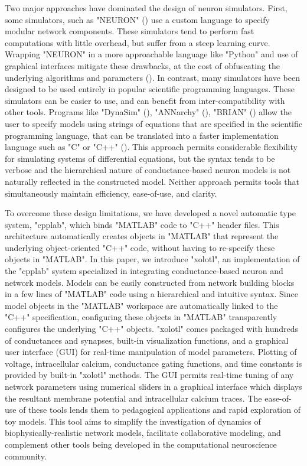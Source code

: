 \documentclass{frontiersSCNS} %
\begin{document}
Two major approaches have dominated the design of neuron simulators. First, some simulators, such as "NEURON" (\cite{hinesNEURONSimulationEnvironment1997}) use a custom language to specify modular network components. These simulators tend to perform fast computations with little overhead, but suffer from a steep learning curve. Wrapping "NEURON" in a more approachable language like "Python" and use of graphical interfaces mitigate these drawbacks, at the cost of obfuscating the underlying algorithms and parameters (\cite{bretteSimulationNetworksSpiking2007, hinesNEURONPython2009}). In contrast, many simulators have been designed to be used entirely in popular scientific programming languages. These simulators can be easier to use, and can benefit from inter-compatibility with other tools. Programs like "DynaSim" (\cite{sherfeyDynaSimMATLABToolbox2018}), "ANNarchy" (\cite{vitayANNarchyCodeGeneration2015}), "BRIAN" (\cite{stimbergBrianSecondComing2013}) allow the user to specify models using strings of equations that are specified in the scientific programming language, that can be translated into a faster implementation language such as "C" or "C++" (\cite{stimbergEquationorientedSpecificationNeural2014}). This approach permits considerable flexibility for simulating systems of differential equations, but the syntax tends to be verbose and the hierarchical nature of conductance-based neuron models is not naturally reflected in the constructed model. Neither approach permits tools that simultaneously maintain efficiency, ease-of-use, and clarity.

To overcome these design limitations, we have developed a novel automatic type system, "cpplab", which binds "MATLAB" code to "C++" header files. This architecture automatically creates objects in "MATLAB" that represent the underlying object-oriented "C++" code, without having to re-specify these objects in "MATLAB". In this paper, we introduce "xolotl", an implementation of the "cpplab" system specialized in integrating conductance-based neuron and network models. Models can be easily constructed from network building blocks in a few lines of "MATLAB" code using a hierarchical and intuitive syntax. Since model objects in the "MATLAB" workspace are automatically linked to the "C++" specification, configuring these objects in "MATLAB" transparently configures the underlying "C++" objects. "xolotl" comes packaged with hundreds of conductances and synapses, built-in visualization functions, and a graphical user interface (GUI) for real-time manipulation of model parameters. Plotting of voltage, intracellular calcium, conductance gating functions, and time constants is provided by built-in "xolotl" methods. The GUI permits real-time tuning of any network parameters using numerical sliders in a graphical interface which displays the resultant membrane potential and intracellular calcium traces. The ease-of-use of these tools lends them to pedagogical applications and rapid exploration of toy models. This tool aims to simplify the investigation of dynamics of biophysically-realistic network models, facilitate collaborative modeling, and complement other tools being developed in the computational neuroscience community.
\end{document}
